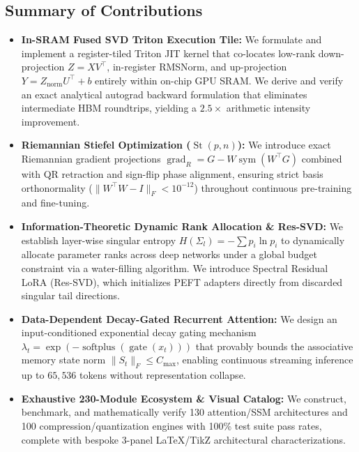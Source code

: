 \subsection{Summary of Contributions}
\begin{itemize}
    \item \textbf{In-SRAM Fused SVD Triton Execution Tile:} We formulate and implement a register-tiled Triton JIT kernel that co-locates low-rank down-projection $Z = X V^\top$, in-register RMSNorm, and up-projection $Y = Z_{\text{norm}} U^\top + b$ entirely within on-chip GPU SRAM. We derive and verify an exact analytical autograd backward formulation that eliminates intermediate HBM roundtrips, yielding a $2.5\times$ arithmetic intensity improvement.
    \item \textbf{Riemannian Stiefel Optimization ($\operatorname{St}(p, n)$):} We introduce exact Riemannian gradient projections $\operatorname{grad}_R = G - W \operatorname{sym}(W^\top G)$ combined with QR retraction and sign-flip phase alignment, ensuring strict basis orthonormality ($\|W^\top W - I\|_F < 10^{-12}$) throughout continuous pre-training and fine-tuning.
    \item \textbf{Information-Theoretic Dynamic Rank Allocation \& Res-SVD:} We establish layer-wise singular entropy $H(\Sigma_l) = -\sum p_i \ln p_i$ to dynamically allocate parameter ranks across deep networks under a global budget constraint via a water-filling algorithm. We introduce Spectral Residual LoRA (Res-SVD), which initializes PEFT adapters directly from discarded singular tail directions.
    \item \textbf{Data-Dependent Decay-Gated Recurrent Attention:} We design an input-conditioned exponential decay gating mechanism $\lambda_t = \exp(-\operatorname{softplus}(\operatorname{gate}(x_t)))$ that provably bounds the associative memory state norm $\|S_t\|_F \le C_{\max}$, enabling continuous streaming inference up to $65,536$ tokens without representation collapse.
    \item \textbf{Exhaustive 230-Module Ecosystem \& Visual Catalog:} We construct, benchmark, and mathematically verify 130 attention/SSM architectures and 100 compression/quantization engines with 100\% test suite pass rates, complete with bespoke 3-panel LaTeX/TikZ architectural characterizations.
\end{itemize}
